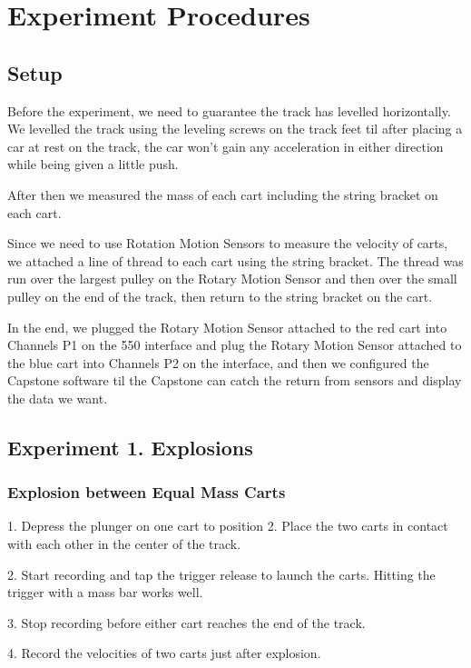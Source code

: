 \documentclass[12pt]{article}
\begin{document}
	\section{Experiment Procedures}
	\subsection{Setup}
		Before the experiment, we need to guarantee the track has levelled horizontally. We levelled the track using the leveling screws on the track feet til after placing a car at rest on the track, the car won't gain any acceleration in either direction while being given a little push. \par
		After then we measured the mass of each cart including the string bracket on each cart. \par
		Since we need to use Rotation Motion Sensors to measure the velocity of carts, we attached a line of thread to each cart using the string bracket. The thread was run over the largest pulley on the Rotary Motion Sensor and then over the small pulley on the end of the track, then return to the string bracket on the cart. \par 
		In the end, we plugged the Rotary Motion Sensor attached to the red cart into Channels P1 on the 550 interface and plug the Rotary Motion Sensor attached to the blue cart into Channels P2 on the interface, and then we configured the Capstone software til the Capstone can catch the return from sensors and display the data we want. \par 
	\subsection{Experiment 1. Explosions}
		\subsubsection{Explosion between Equal Mass Carts}
		1. Depress the plunger on one cart to position 2. Place the two carts in contact with each other in the center of the track. \par
		2. Start recording and tap the trigger release to launch the carts. Hitting the trigger with a mass bar works well. \par
		3. Stop recording before either cart reaches the end of the track. \par 
		4. Record the velocities of two carts just after explosion. \par 
\end{document}
